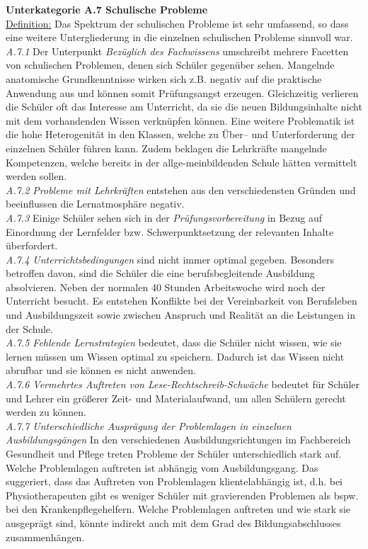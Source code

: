 \textbf{Unterkategorie A.7 Schulische Probleme}\\
\underline{Definition:} Das Spektrum der schulischen Probleme ist sehr umfassend, so dass eine weitere Untergliederung in die einzelnen schulischen Probleme sinnvoll war.\\
\textit{A.7.1} Der Unterpunkt \textit{Bezüglich des Fachwissens} umschreibt mehrere Facetten von schulischen Problemen, denen sich Schüler gegenüber sehen. Mangelnde anatomische Grundkenntnisse wirken sich z.B. negativ auf die praktische Anwendung aus und können somit Prüfungsangst erzeugen. Gleichzeitig verlieren die Schüler oft das Interesse am Unterricht, da sie die neuen Bildungsinhalte nicht mit dem vorhandenden Wissen verknüpfen können. Eine weitere Problematik ist die hohe Heterogenität in den Klassen, welche zu Über-- und Unterforderung der einzelnen Schüler führen kann. Zudem beklagen die Lehrkräfte mangelnde Kompetenzen, welche bereits in der allge-meinbildenden Schule hätten vermittelt werden sollen.\\
\textit{A.7.2 Probleme mit Lehrkräften} entstehen aus den verschiedensten Gründen und beeinflussen die Lernatmosphäre negativ.\\
\textit{A.7.3} Einige Schüler sehen sich in der \textit{Prüfungsvorbereitung} in Bezug auf Einordnung der Lernfelder bzw. Schwerpunktsetzung der relevanten Inhalte überfordert.\\
\textit{A.7.4 Unterrichtsbedingungen} sind nicht immer optimal gegeben. Besonders betroffen davon, sind die Schüler die eine berufsbegleitende Ausbildung absolvieren. Neben der normalen 40 Stunden Arbeitswoche wird noch der Unterricht besucht. Es entstehen Konflikte bei der Vereinbarkeit von Berufsleben und Ausbildungszeit sowie zwischen Anspruch und Realität an die Leistungen in der Schule. \\
\textit{A.7.5 Fehlende Lernstrategien} bedeutet, dass die Schüler nicht wissen, wie sie lernen müssen um Wissen optimal zu speichern. Dadurch ist das Wissen nicht abrufbar und sie können es nicht anwenden.\\
\textit{A.7.6 Vermehrtes Auftreten von Lese-Rechtschreib-Schwäche} bedeutet für Schüler und Lehrer ein größerer Zeit- und Materialaufwand, um allen Schülern gerecht werden zu können.\\
\textit{A.7.7 Unterschiedliche Ausprägung der Problemlagen in einzelnen Ausbildungsgängen}
In den verschiedenen Ausbildungsrichtungen im Fachbereich Gesundheit und Pflege treten Probleme der Schüler unterschiedlich stark auf. Welche Problemlagen auftreten ist abhängig vom Ausbildungsgang. Das suggeriert, dass das Auftreten von Problemlagen klientelabhängig ist, d.h. bei Physiotherapeuten gibt es weniger Schüler mit gravierenden Problemen als bspw. bei den Krankenpflegehelfern. Welche Problemlagen auftreten und wie stark sie ausgeprägt sind, könnte indirekt auch mit dem Grad des Bildungsabschlusses zusammenhängen.\\
